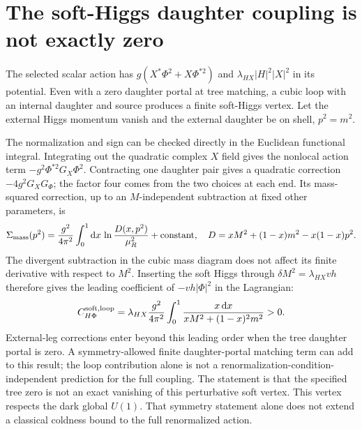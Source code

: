 \documentclass[11pt]{article}
\newcommand{\dd}{\mathrm d}
\begin{document}
\section{The soft-Higgs daughter coupling is not exactly zero}
The selected scalar action has $g(X^*\Phi^2+X\Phi^{*2})$ and
$\lambda_{HX}|H|^2|X|^2$ in its potential. Even with a zero daughter
portal at tree matching, a cubic loop with an internal daughter and source
produces a finite soft-Higgs vertex. Let the external Higgs momentum vanish
and the external daughter be on shell, $p^2=m^2$.

The normalization and sign can be checked directly in the Euclidean
functional integral. Integrating out the quadratic complex $X$ field gives
the nonlocal action term $-g^2\Phi^{*2}G_X\Phi^2$. Contracting one
daughter pair gives a quadratic correction $-4g^2G_XG_\Phi$; the factor
four comes from the two choices at each end. Its mass-squared correction,
up to an $M$-independent subtraction at fixed other parameters, is
\begin{equation}
 \Sigma_{\rm mass}(p^2)={g^2\over4\pi^2}
 \int_0^1\dd x\,\ln{D(x,p^2)\over\mu_R^2}+\text{constant},\quad
 D=xM^2+(1-x)m^2-x(1-x)p^2.
\end{equation}
The divergent subtraction in the cubic mass diagram does not affect its
finite derivative with respect to $M^2$. Inserting the soft Higgs through
$\delta M^2=\lambda_{HX}vh$ therefore gives the leading coefficient
of $-vh|\Phi|^2$ in the Lagrangian:
\begin{equation}
 C_{H\Phi}^{\rm soft,loop}
 =\lambda_{HX}{g^2\over4\pi^2}
 \int_0^1{ x\,\dd x\over xM^2+(1-x)^2m^2}>0.
 \label{pr:loop}
\end{equation}
External-leg corrections enter beyond this leading order when the tree
daughter portal is zero. A symmetry-allowed finite daughter-portal matching
term can add to this result; the loop contribution alone is not a
renormalization-condition-independent prediction for the full coupling.
The statement is that the specified tree zero is not an exact vanishing
of this perturbative soft vertex.
This vertex respects the dark global $U(1)$. That symmetry statement alone
does not extend a classical coldness bound to the full renormalized action.
\end{document}
